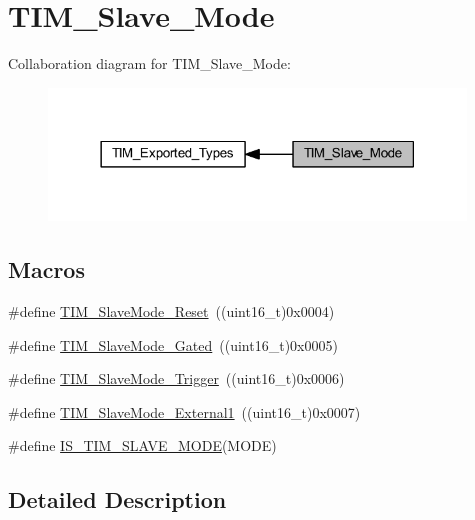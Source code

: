 \hypertarget{group___t_i_m___slave___mode}{}\section{T\+I\+M\+\_\+\+Slave\+\_\+\+Mode}
\label{group___t_i_m___slave___mode}
Collaboration diagram for T\+I\+M\+\_\+\+Slave\+\_\+\+Mode\+:
\nopagebreak
\begin{figure}[H]
\begin{center}
\leavevmode
\includegraphics[width=314pt]{group___t_i_m___slave___mode}
\end{center}
\end{figure}
\subsection*{Macros}
\begin{DoxyCompactItemize}
\item 
\#define \hyperlink{group___t_i_m___slave___mode_gaac1cec731f1a5e680a038c4f472f74af}{T\+I\+M\+\_\+\+Slave\+Mode\+\_\+\+Reset}~((uint16\+\_\+t)0x0004)
\item 
\#define \hyperlink{group___t_i_m___slave___mode_ga1f36c870b926f70b32f274bbc0bc39a5}{T\+I\+M\+\_\+\+Slave\+Mode\+\_\+\+Gated}~((uint16\+\_\+t)0x0005)
\item 
\#define \hyperlink{group___t_i_m___slave___mode_ga9e7726c04ee1bafec97226f08adf5677}{T\+I\+M\+\_\+\+Slave\+Mode\+\_\+\+Trigger}~((uint16\+\_\+t)0x0006)
\item 
\#define \hyperlink{group___t_i_m___slave___mode_ga34427a693157ab177fead9871185bd35}{T\+I\+M\+\_\+\+Slave\+Mode\+\_\+\+External1}~((uint16\+\_\+t)0x0007)
\item 
\#define \hyperlink{group___t_i_m___slave___mode_ga7f0e666bc968c56df7f1f6c2465c89fb}{I\+S\+\_\+\+T\+I\+M\+\_\+\+S\+L\+A\+V\+E\+\_\+\+M\+O\+DE}(M\+O\+DE)
\end{DoxyCompactItemize}


\subsection{Detailed Description}


